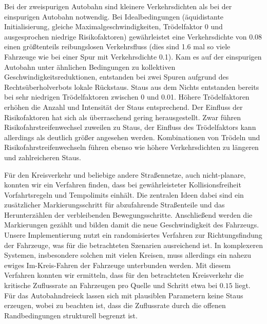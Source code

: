 \documentclass[10pt, a4paper]{article}
\newcommand\myref[1]{\ref{#1} (S. \pageref{#1})}
\newcommand\myrefcomma[1]{\ref{#1}, S. \pageref{#1}}
\begin{document}
Bei der zweispurigen Autobahn sind kleinere Verkehrsdichten als bei der einspurigen Autobahn notwendig. Bei Idealbedingungen (äquidistante Initialisierung, gleiche Maximalgeschwindigkeiten, Trödelfaktor 0 und ausgesprochen niedrige Risikofaktoren) gewährleistet eine Verkehrsdichte von 0.08 einen größtenteils reibungslosen Verkehrsfluss (dies sind 1.6 mal so viele Fahrzeuge wie bei einer Spur mit Verkehrsdichte 0.1). Kam es auf der einspurigen Autobahn unter ähnlichen Bedingungen zu kollektiven Geschwindigkeitsreduktionen, entstanden bei zwei Spuren aufgrund des Rechtsüberholverbots lokale Rückstaus. Staus aus dem Nichts entstanden bereits bei sehr niedrigen Trödelfaktoren zwischen 0 und 0.01. Höhere Trödelfaktoren erhöhen die Anzahl und Intensität der Staus entsprechend. Der Einfluss der Risikofaktoren hat sich als überraschend gering herausgestellt. Zwar führen Risikofahrstreifenwechsel zuweilen zu Staus, der Einfluss des Trödelfaktors kann allerdings als deutlich größer angesehen werden. Kombinationen von Trödeln und Risikofahrstreifenwechseln führen ebenso wie höhere Verkehrsdichten zu längeren und zahlreicheren Staus. 

Für den Kreisverkehr und beliebige andere Straßennetze, auch nicht-planare, konnten wir ein Verfahren finden, dass bei gewährleisteter Kollisionsfreiheit Vorfahrtsregeln und Tempolimits einhält. Die zentralen Ideen dabei sind ein zusätzlicher Markierungsschritt für abzufahrende Straßenteile und das Herunterzählen der verbleibenden Bewegungsschritte. Anschließend werden die Markierungen gezählt und bilden damit die neue Geschwindigkeit des Fahrzeugs. Unsere Implementierung nutzt ein randomisiertes Verfahren zur Richtungsfindung der Fahrzeuge, was für die betrachteten Szenarien ausreichend ist. In komplexeren Systemen, insbesondere solchen mit vielen Kreisen, muss allerdings ein nahezu ewiges Im-Kreis-Fahren der Fahrzeuge unterbunden werden. Mit diesem Verfahren konnten wir ermitteln, dass für den betrachteten Kreisverkehr die kritische Zuflussrate an Fahrzeugen pro Quelle und Schritt etwa bei $0.15$ liegt. Für das Autobahndreieck lassen sich mit plausiblen Parametern keine Staus erzeugen, wobei zu beachten ist, dass die Zuflussrate durch die offenen Randbedingungen strukturell begrenzt ist.


{}

\end{document}
